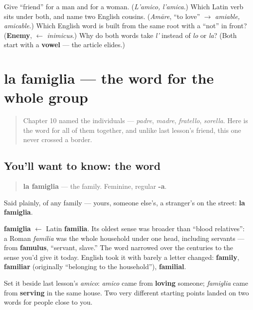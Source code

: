 \begin{tcolorbox}[breakable,colback=teal!4,colframe=teal!35!black,title={Before you move on}]
Give \textquotedblleft{}friend\textquotedblright{} for a man and for a woman. (\emph{L'amico, l'amica}.) Which Latin verb sits under both, and name two English cousins. (\emph{Amāre}, \textquotedblleft{}to love\textquotedblright{} $\to$ \emph{amiable, amicable}.) Which English word is built from the same root with a \textquotedblleft{}not\textquotedblright{} in front? (\textbf{Enemy}, $\leftarrow$ \emph{inimicus}.) Why do both words take \emph{l'} instead of \emph{lo} or \emph{la}? (Both start with a \textbf{vowel} — the article elides.)
\end{tcolorbox}
\section[la famiglia]{la famiglia — the word for the whole group}

\label{lesson:IT-C23-famiglia}



\begin{quote}
Chapter 10 named the individuals — \emph{padre}, \emph{madre}, \emph{fratello}, \emph{sorella}. Here is the word for all of them together, and unlike last lesson's friend, this one never crossed a border.
\end{quote}

\subsection*{You'll want to know: the word}
\begin{quote}
\textbf{la famiglia} — the family. Feminine, regular \textbf{-a}.
\end{quote}

Said plainly, of any family — yours, someone else's, a stranger's on the street: \textbf{la famiglia}.

\begin{cousinweb}
\textbf{famiglia} $\leftarrow$ Latin \textbf{familia}. Its oldest sense was broader than \textquotedblleft{}blood relatives\textquotedblright{}: a Roman \emph{familia} was the whole household under one head, including servants — from \textbf{famulus}, \textquotedblleft{}servant, slave.\textquotedblright{} The word narrowed over the centuries to the sense you'd give it today. English took it with barely a letter changed: \textbf{family}, \textbf{familiar} (originally \textquotedblleft{}belonging to the household\textquotedblright{}), \textbf{familial}.

Set it beside last lesson's \emph{amico}: \emph{amico} came from \textbf{loving} someone; \emph{famiglia} came from \textbf{serving} in the same house. Two very different starting points landed on two words for people close to you.
\end{cousinweb}

